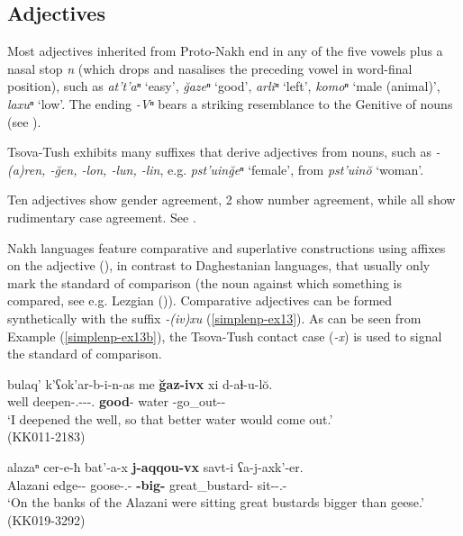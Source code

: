 \subsection{Adjectives} \label{adjectives}

Most adjectives inherited from Proto-Nakh end in any of the five vowels plus a nasal stop \textit{n} (which drops and nasalises the preceding vowel in word-final position), such as \textit{at't'aⁿ} `easy', \textit{\u{g}azeⁿ} `good', \textit{arliⁿ} `left', \textit{komoⁿ} `male (animal)', \textit{laxuⁿ} `low'. The ending \textit{-Vⁿ} bears a striking resemblance to the Genitive of nouns (see ).

Tsova-Tush exhibits many suffixes that derive adjectives from nouns, such as \textit{-(a)ren, -\u{g}en, -lon, -lun, -lin}, e.g.  \textit{pst'uin\u{g}eⁿ} `female', from \textit{pst'uin\u{o}} `woman'.

Ten adjectives show gender agreement, 2 show number agreement, while all show rudimentary case agreement. See .

Nakh languages feature comparative and superlative constructions using affixes on the adjective (\cite[452]{desheriev1963comparative}), in contrast to Daghestanian languages, that usually only mark the standard of comparison (the noun against which something is compared, see e.g. Lezgian (\cite[432]{haspelmath1993lezgian})). Comparative adjectives can be formed synthetically with the suffix \textit{-(iv)xu} (\ref{simplenp-ex13}). As can be seen from Example (\ref{simplenp-ex13b}), the Tsova-Tush contact case (\textit{-x}) is used to signal the standard of comparison.

\begin{exe}
	\ex\label{simplenp-ex13}
	\begin{xlist}
		
		\ex\label{simplenp-ex13a}
		\gll bulaq' k'ʕok'ar-b-i-n-as me \textbf{\u{g}az-ivx} xi d-aɬ-u-l\u{o}. \\
		well deepen-{\B}.{\Sg}-{\Tr}-{\Aor}-{\Fsg}.{\Erg} {\Subord} \textbf{good}-{\Cmp} water {\D}-go\_out-{\Npst}-{\Sbjv} \\
		\trans `I deepened the well, so that better water would come out.' \\
		\hfill (KK011-2183)
		
		\ex\label{simplenp-ex13b}
		\gll alazaⁿ cer-e-ħ bat'-a-x \textbf{j-aqqou-vx} savt-i ʕa-j-axk'-er. \\
		Alazani edge-{\Obl}-{\Ess} goose-{\Obl}.{\Pl}-{\Cont} \textbf{{\J}-big-{\Cmp}} great\_bustard-{\Pl} sit-{\J}-{\Lv}.{\Pl}-{{\Imprf}} \\
		\trans `On the banks of the Alazani were sitting great bustards bigger than geese.'
		\hfill (KK019-3292)
		
	\end{xlist}
\end{exe}

